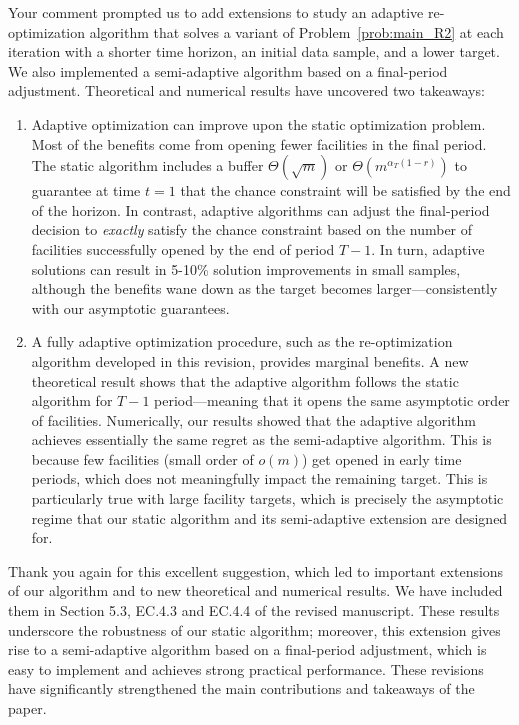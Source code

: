\documentclass[11pt]{article}
\begin{document}
Your comment prompted us to add extensions to study an adaptive re-optimization algorithm that solves a variant of Problem~\eqref{prob:main_R2} at each iteration with a shorter time horizon, an initial data sample, and a lower target. We also implemented a semi-adaptive algorithm based on a final-period adjustment. Theoretical and numerical results have uncovered two takeaways:
\begin{enumerate}
    \item Adaptive optimization can improve upon the static optimization problem. Most of the benefits come from opening fewer facilities in the final period. The static algorithm includes a buffer $\Theta(\sqrt{m})$ or $\Theta(m^{\alpha_T(1-r)})$ to guarantee at time $t=1$ that the chance constraint will be satisfied by the end of the horizon. In contrast, adaptive algorithms can adjust the final-period decision to \textit{exactly} satisfy the chance constraint based on the number of facilities successfully opened by the end of period $T-1$. In turn, adaptive solutions can result in 5-10\% solution improvements in small samples, although the benefits wane down as the target becomes larger---consistently with our asymptotic guarantees.
    \item A fully adaptive optimization procedure, such as the re-optimization algorithm developed in this revision, provides marginal benefits. A new theoretical result shows that the adaptive algorithm follows the static algorithm for $T-1$ period---meaning that it opens the same asymptotic order of facilities. Numerically, our results showed that the adaptive algorithm achieves essentially the same regret as the semi-adaptive algorithm. This is because few facilities (small order of $o(m)$) get opened in early time periods, which does not meaningfully impact the remaining target. This is particularly true with large facility targets, which is precisely the asymptotic regime that our static algorithm and its semi-adaptive extension are designed for.
\end{enumerate}

Thank you again for this excellent suggestion, which led to important extensions of our algorithm and to new theoretical and numerical results. We have included them in Section 5.3, EC.4.3 and EC.4.4 of the revised manuscript. These results underscore the robustness of our static algorithm; moreover, this extension gives rise to a semi-adaptive algorithm based on a final-period adjustment, which is easy to implement and achieves strong practical performance. These revisions have significantly strengthened the main contributions and takeaways of the paper.
\end{document}

